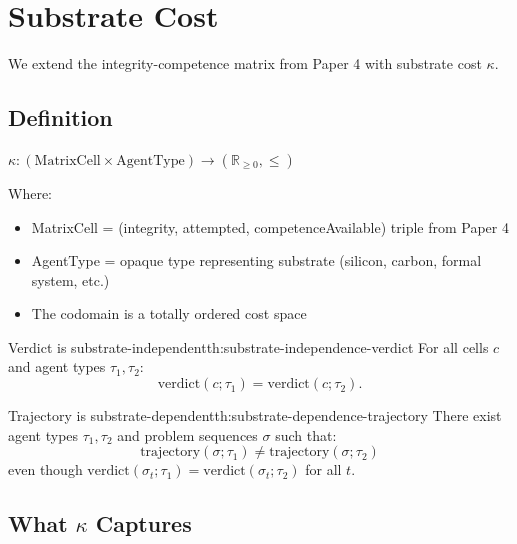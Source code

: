 \section{Substrate Cost}\label{sec:substrate-cost}

We extend the integrity-competence matrix from Paper 4 with substrate cost $\kappa$.

\subsection{Definition}

\begin{definition}\label{def:substrate-cost}
$\kappa : (\text{MatrixCell} \times \text{AgentType}) \to (\mathbb{R}_{\ge 0}, \leq)$

Where:
\begin{itemize}
\item MatrixCell = (integrity, attempted, competenceAvailable) triple from Paper 4
\item AgentType = opaque type representing substrate (silicon, carbon, formal system, etc.)
\item The codomain is a totally ordered cost space
\end{itemize}
\end{definition}

\begin{claim}{Verdict is substrate-independent}{th:substrate-independence-verdict}
For all cells $c$ and agent types $\tau_1, \tau_2$:
\[
\text{verdict}(c; \tau_1) = \text{verdict}(c; \tau_2).
\]
\end{claim}


\begin{claim}{Trajectory is substrate-dependent}{th:substrate-dependence-trajectory}
There exist agent types $\tau_1, \tau_2$ and problem sequences $\sigma$ such that:
\[
\text{trajectory}(\sigma; \tau_1) \neq \text{trajectory}(\sigma; \tau_2)
\]
even though $\text{verdict}(\sigma_t; \tau_1) = \text{verdict}(\sigma_t; \tau_2)$ for all $t$.
\end{claim}


\subsection{What $\kappa$ Captures}

